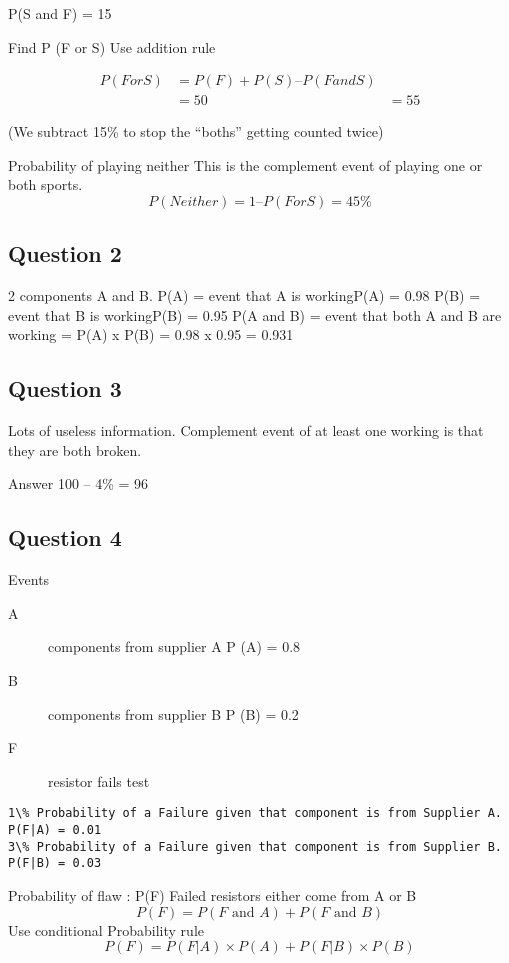 \documentclass[]{report}
\begin{document}
P(S and F) = 15%

Find P (F or S)
Use addition rule

\begin{eqnarray}P (F or S)  &=  P(F) + P(S) – P( Fand S)\\
&=  50%
&=   55%
\end{eqnarray}

(We subtract 15\% to stop the “boths” getting counted twice)

Probability of playing neither
This is the complement event of playing one or both sports.
\[P(Neither) = 1 –  P( F or S)  = 45\%\]

\subsection{Question 2} 
2 components A and B.
P(A) = event that A is workingP(A) = 0.98
P(B) = event that B is workingP(B) = 0.95
P(A and B) = event that both A and B are working = P(A) x P(B) = 0.98 x 0.95 = 0.931

\subsection{Question 3}
Lots of useless information.
Complement event of at least one working is that they are both broken.

Answer  100 – 4\% = 96%

\subsection{Question 4}



Events 
\begin{description}
\item[A] components from supplier A  P (A) = 0.8 
\item[B] components from supplier B  P (B) = 0.2 
\item[F] resistor fails test
\end{description}

\begin{verbatim}
1\% Probability of a Failure given that component is from Supplier A.      P(F|A) = 0.01
3\% Probability of a Failure given that component is from Supplier B.      P(F|B) = 0.03
\end{verbatim}
Probability of flaw : P(F)
Failed resistors either come from A or B
\[P( F) =  P ( F \mbox{ and } A)  +  P( F \mbox{ and } B)\]
Use conditional Probability  rule
\[P(F) = P(F|A)\times P(A)  + P(F|B)\times P(B)\]
\end{document}
